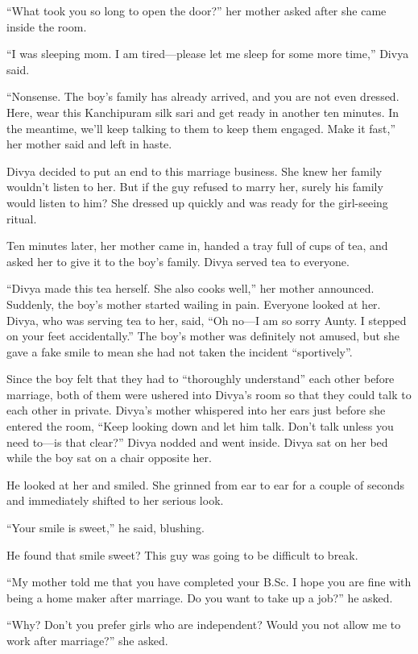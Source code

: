 “What took you so long to open the door?” her mother asked after she came inside
the room.

“I was sleeping mom. I am tired—please let me sleep for some more time,” Divya
said.

“Nonsense. The boy's family has already arrived, and you are not even dressed. Here,
wear this Kanchipuram silk sari and get ready in another ten minutes. In the
meantime, we'll keep talking to them to keep them engaged. Make it fast,” her
mother said and left in haste.

Divya decided to put an end to this marriage business. She knew her family
wouldn't listen to her. But if the guy refused to marry her, surely his family
would listen to him? She dressed up quickly and was ready for the girl-seeing
ritual.

Ten minutes later, her mother came in, handed a tray full of cups of tea, and
asked her to give it to the boy's family. Divya served tea to everyone.

“Divya made this tea herself. She also cooks well,” her mother announced.
Suddenly, the boy's mother started wailing in pain. Everyone looked at her.
Divya, who was serving tea to her, said, “Oh no—I am so sorry Aunty. I stepped
on your feet accidentally.” The boy's mother was definitely not amused, but she
gave a fake smile to mean she had not taken the incident “sportively”.

Since the boy felt that they had to “thoroughly understand” each other before
marriage, both of them were ushered into Divya's room so that they could talk to
each other in private. Divya's mother whispered into her ears just before she
entered the room, “Keep looking down and let him talk. Don't talk unless you
need to—is that clear?” Divya nodded and went inside. Divya sat on her bed
while the boy sat on a chair opposite her.

He looked at her and smiled. She grinned from ear to ear for a couple of seconds
and immediately shifted to her serious look.

“Your smile is sweet,” he said, blushing.

He found that smile sweet? This guy was going to be difficult to break.

“My mother told me that you have completed your B.Sc. I hope you are fine with
being a home maker after marriage. Do you want to take up a job?” he asked.

“Why? Don't you prefer girls who are independent? Would you not allow me to work
after marriage?” she asked.


